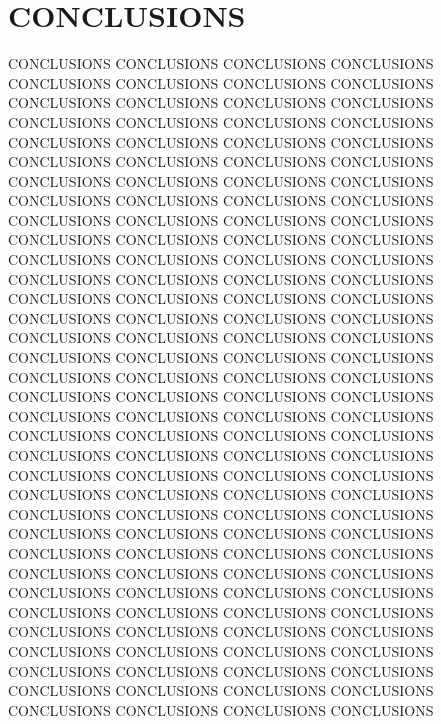 \section{CONCLUSIONS}

CONCLUSIONS CONCLUSIONS CONCLUSIONS CONCLUSIONS CONCLUSIONS CONCLUSIONS CONCLUSIONS CONCLUSIONS
CONCLUSIONS CONCLUSIONS CONCLUSIONS CONCLUSIONS CONCLUSIONS CONCLUSIONS CONCLUSIONS CONCLUSIONS
CONCLUSIONS CONCLUSIONS CONCLUSIONS CONCLUSIONS CONCLUSIONS CONCLUSIONS CONCLUSIONS CONCLUSIONS
CONCLUSIONS CONCLUSIONS CONCLUSIONS CONCLUSIONS CONCLUSIONS CONCLUSIONS CONCLUSIONS CONCLUSIONS
CONCLUSIONS CONCLUSIONS CONCLUSIONS CONCLUSIONS CONCLUSIONS CONCLUSIONS CONCLUSIONS CONCLUSIONS
CONCLUSIONS CONCLUSIONS CONCLUSIONS CONCLUSIONS CONCLUSIONS CONCLUSIONS CONCLUSIONS CONCLUSIONS
CONCLUSIONS CONCLUSIONS CONCLUSIONS CONCLUSIONS CONCLUSIONS CONCLUSIONS CONCLUSIONS CONCLUSIONS
CONCLUSIONS CONCLUSIONS CONCLUSIONS CONCLUSIONS CONCLUSIONS CONCLUSIONS CONCLUSIONS CONCLUSIONS
CONCLUSIONS CONCLUSIONS CONCLUSIONS CONCLUSIONS CONCLUSIONS CONCLUSIONS CONCLUSIONS CONCLUSIONS
CONCLUSIONS CONCLUSIONS CONCLUSIONS CONCLUSIONS CONCLUSIONS CONCLUSIONS CONCLUSIONS CONCLUSIONS
CONCLUSIONS CONCLUSIONS CONCLUSIONS CONCLUSIONS CONCLUSIONS CONCLUSIONS CONCLUSIONS CONCLUSIONS
CONCLUSIONS CONCLUSIONS CONCLUSIONS CONCLUSIONS CONCLUSIONS CONCLUSIONS CONCLUSIONS CONCLUSIONS
CONCLUSIONS CONCLUSIONS CONCLUSIONS CONCLUSIONS CONCLUSIONS CONCLUSIONS CONCLUSIONS CONCLUSIONS
CONCLUSIONS CONCLUSIONS CONCLUSIONS CONCLUSIONS CONCLUSIONS CONCLUSIONS CONCLUSIONS CONCLUSIONS
CONCLUSIONS CONCLUSIONS CONCLUSIONS CONCLUSIONS CONCLUSIONS CONCLUSIONS CONCLUSIONS CONCLUSIONS
CONCLUSIONS CONCLUSIONS CONCLUSIONS CONCLUSIONS CONCLUSIONS CONCLUSIONS CONCLUSIONS CONCLUSIONS
CONCLUSIONS CONCLUSIONS CONCLUSIONS CONCLUSIONS CONCLUSIONS CONCLUSIONS CONCLUSIONS CONCLUSIONS

